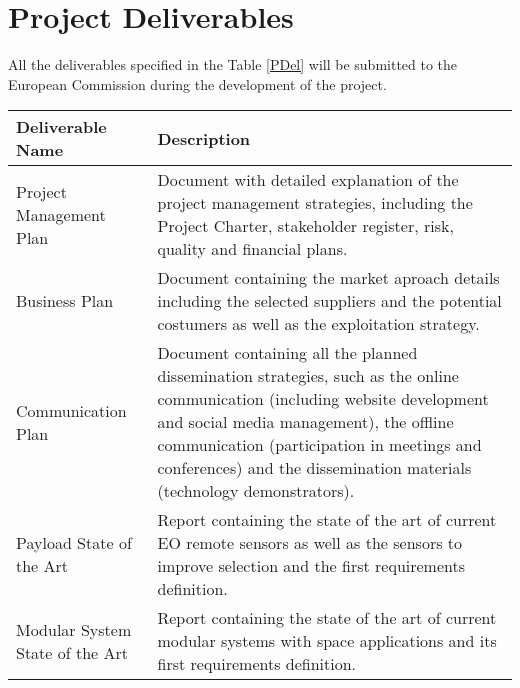 \section{Project Deliverables}

All the deliverables specified in the Table \ref{PDel} will be submitted to the European Commission during the development of the project. 

\begin{longtable}[H]{>{\raggedright\arraybackslash}p{4cm} p{10cm}}
	
	\toprule[2pt]
	
	\textbf{Deliverable Name} & \textbf{Description} \\
	
	\midrule[1.5pt] 
	\endhead
	
	Project Management Plan & Document with detailed explanation of the project management strategies, including the Project Charter, stakeholder register, risk, quality and financial plans.\vspace{0.2cm} \\
	
	\midrule

	Business Plan & Document containing the market aproach details including the selected suppliers and the potential costumers as well as the exploitation strategy.\vspace{0.2cm} \\
	
	\midrule
	
	Communication Plan  & Document containing all the planned dissemination strategies, such as the online communication (including website development and social media management), the offline communication (participation in meetings and conferences) and the dissemination materials (technology demonstrators).\vspace{0.2cm} \\
	
	\midrule

	Payload State of the Art  & Report containing the state of the art of current EO remote sensors as well as the sensors to improve selection and the first requirements definition.\vspace{0.2cm} \\
	
	\midrule

	Modular System State of the Art  & Report containing the state of the art of current modular systems with space applications and its first requirements definition.\vspace{0.2cm} \\
	

\end{longtable}
